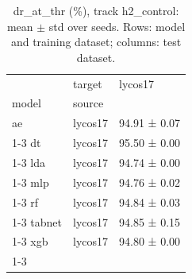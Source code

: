 \begin{table}
\caption{dr_at_thr (\%), track h2_control: mean $\pm$ std over seeds. Rows: model and training dataset; columns: test dataset.}
\label{tab:matrix_h2_control_dr_at_thr}
\begin{tabular}{lll}
\toprule
 & target & lycos17 \\
model & source &  \\
\midrule
ae & lycos17 & 94.91 ± 0.07 \\
\cline{1-3}
dt & lycos17 & 95.50 ± 0.00 \\
\cline{1-3}
lda & lycos17 & 94.74 ± 0.00 \\
\cline{1-3}
mlp & lycos17 & 94.76 ± 0.02 \\
\cline{1-3}
rf & lycos17 & 94.84 ± 0.03 \\
\cline{1-3}
tabnet & lycos17 & 94.85 ± 0.15 \\
\cline{1-3}
xgb & lycos17 & 94.80 ± 0.00 \\
\cline{1-3}
\bottomrule
\end{tabular}
\end{table}
